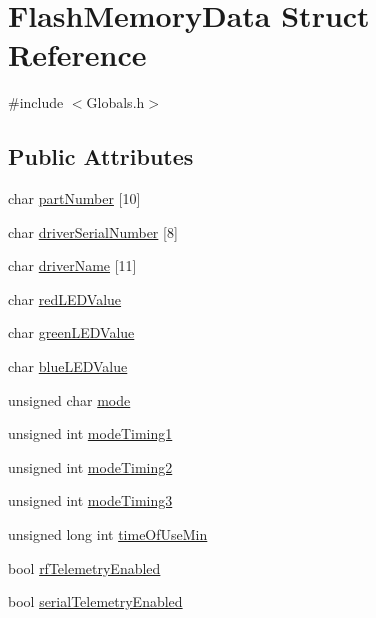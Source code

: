 \hypertarget{structFlashMemoryData}{}\section{Flash\+Memory\+Data Struct Reference}
\label{structFlashMemoryData}


{\ttfamily \#include $<$Globals.\+h$>$}

\subsection*{Public Attributes}
\begin{DoxyCompactItemize}
\item 
char \hyperlink{structFlashMemoryData_a705e1d416a34d2ccc01ceefb29a87107}{part\+Number} \mbox{[}10\mbox{]}
\item 
char \hyperlink{structFlashMemoryData_aa1979cdc22a417ffc32a019be7b471b8}{driver\+Serial\+Number} \mbox{[}8\mbox{]}
\item 
char \hyperlink{structFlashMemoryData_acc795cc627dad7b6e2e0eeb0c7adf9f7}{driver\+Name} \mbox{[}11\mbox{]}
\item 
char \hyperlink{structFlashMemoryData_aa29665746360a0d2a805debad70bd35a}{red\+L\+E\+D\+Value}
\item 
char \hyperlink{structFlashMemoryData_ace37d1ae35660e2af893530d50b24c48}{green\+L\+E\+D\+Value}
\item 
char \hyperlink{structFlashMemoryData_a740528a2ae1beb940f4f3286c4a31438}{blue\+L\+E\+D\+Value}
\item 
unsigned char \hyperlink{structFlashMemoryData_aa0c7f427a26e432cccf13da23fd5d447}{mode}
\item 
unsigned int \hyperlink{structFlashMemoryData_a4fb83987f5c20eb21e133bb968817421}{mode\+Timing1}
\item 
unsigned int \hyperlink{structFlashMemoryData_adb10643e88fbd03db295b843c913883e}{mode\+Timing2}
\item 
unsigned int \hyperlink{structFlashMemoryData_abf400b8235e203ec4ccfdfa5aedcdcec}{mode\+Timing3}
\item 
unsigned long int \hyperlink{structFlashMemoryData_a4bec4294af40d5b6ff0949a7c0af9620}{time\+Of\+Use\+Min}
\item 
bool \hyperlink{structFlashMemoryData_a3b88de12ed87ebc9b4e5ee272dc4389f}{rf\+Telemetry\+Enabled}
\item 
bool \hyperlink{structFlashMemoryData_a4bb2dc9e647ff6663d74cf6c2294f3ab}{serial\+Telemetry\+Enabled}

\end{DoxyCompactItemize}

